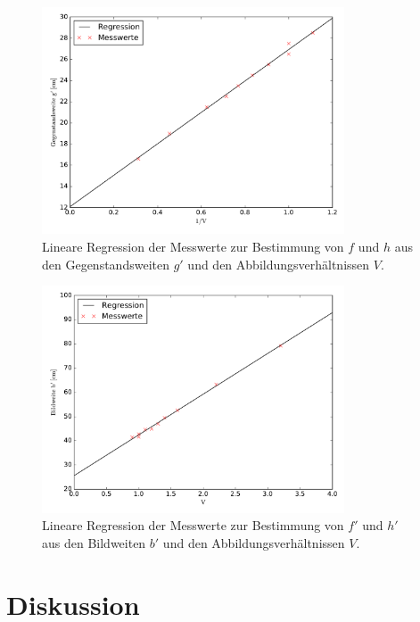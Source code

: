 \documentclass[
  parskip=half,
  bibliography=totoc,     %
  captions=tableheading,  %
  titlepage=firstiscover, %
]{scrartcl}
\begin{document}
\begin{figure}[H]
    \centering
    \includegraphics[width=0.8\textwidth]{AbbeV.pdf}
    \caption{Lineare Regression der Messwerte zur Bestimmung von $f$ und $h$ aus den Gegenstandsweiten $g'$ und den Abbildungsverhältnissen $V$.}
    \label{fig:plot_abbe_1}
\end{figure}

\begin{figure}[H]
    \centering
    \includegraphics[width=0.8\textwidth]{AbbeV2.pdf}
    \caption{Lineare Regression der Messwerte zur Bestimmung von $f'$ und $h'$ aus den Bildweiten $b'$ und den Abbildungsverhältnissen $V$.}
    \label{fig:plot_abbe_2}
\end{figure}
\section{Diskussion}
\label{sec:diskussion}
\end{document}
